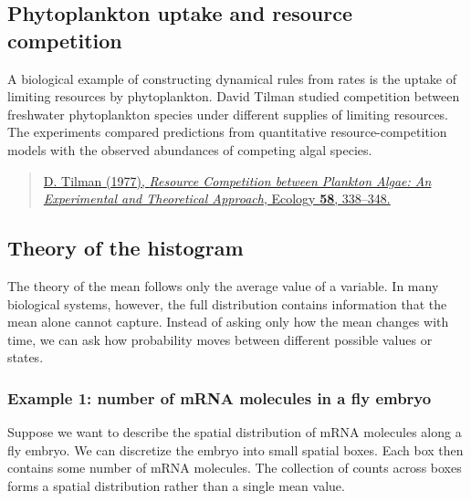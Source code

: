\subsection{Phytoplankton uptake and resource competition}

A biological example of constructing dynamical rules from rates is the uptake of limiting resources by phytoplankton.
David Tilman studied competition between freshwater phytoplankton species under different supplies of limiting resources.
The experiments compared predictions from quantitative resource-competition models with the observed abundances of competing algal species.

\begin{quote}
\href{https://hahana.soest.hawaii.edu/cmoreserver/summercourse/2015/documents/Follows_05-30/Tilman-1977.pdf}{
    D. Tilman (1977),
    \textit{Resource Competition between Plankton Algae: An Experimental and Theoretical Approach},
    Ecology \textbf{58}, 338--348.
    }
\end{quote}


\subsection{Theory of the histogram}

The theory of the mean follows only the average value of a variable.
In many biological systems, however, the full distribution contains information that the mean alone cannot capture.
Instead of asking only how the mean changes with time, we can ask how probability moves between different possible values or states.

\subsubsection*{Example 1: number of mRNA molecules in a fly embryo}

Suppose we want to describe the spatial distribution of mRNA molecules along a fly embryo.
We can discretize the embryo into small spatial boxes.
Each box then contains some number of mRNA molecules.
The collection of counts across boxes forms a spatial distribution rather than a single mean value.


